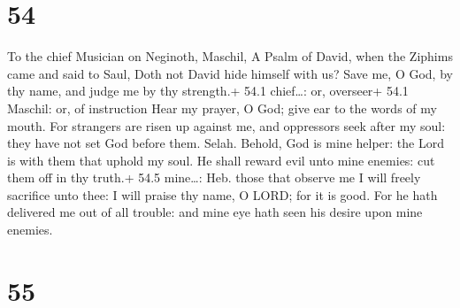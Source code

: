 \hypertarget{section-53}{%
\section{54}\label{section-53}}

To the chief Musician on Neginoth, Maschil, A Psalm of David, when the
Ziphims came and said to Saul, Doth not David hide himself with us?
 Save me, O God, by thy name, and judge me by thy strength.+
54.1 chief\ldots: or, overseer+ 54.1 Maschil: or, of instruction
 Hear my prayer, O God; give ear to the words of my mouth.
 For strangers are risen up against me, and oppressors seek
after my soul: they have not set God before them. Selah. 
Behold, God is mine helper: the Lord is with them that uphold my soul.
 He shall reward evil unto mine enemies: cut them off in thy
truth.+ 54.5 mine\ldots: Heb. those that observe me  I will
freely sacrifice unto thee: I will praise thy name, O LORD; for it is
good.  For he hath delivered me out of all trouble: and mine
eye hath seen his desire upon mine enemies.

\hypertarget{section-54}{%
\section{55}\label{section-54}}

